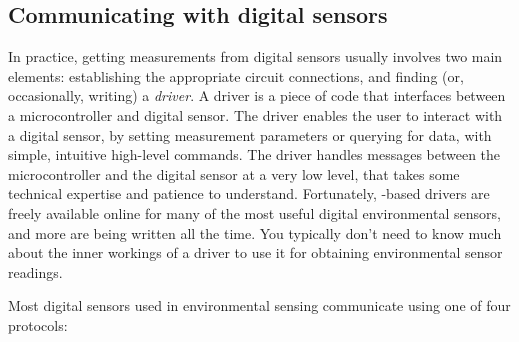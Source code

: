 \subsection{Communicating with digital sensors}
In practice, getting measurements from digital sensors usually involves two main elements: establishing the appropriate circuit connections, and finding (or, occasionally, writing) a \emph{driver}.
A driver is a piece of code that interfaces between a microcontroller and digital sensor.
The driver enables the user to interact with a digital sensor, \eg by setting measurement parameters or querying for data, with simple, intuitive high-level \Micropython commands.
The driver handles messages between the microcontroller and the digital sensor at a very low level, that takes some technical expertise and patience to understand.
Fortunately, \Micropython-based drivers are freely available online for many of the most useful digital environmental sensors, and more are being written all the time.
You typically don't need to know much about the inner workings of a driver to use it for obtaining environmental sensor readings.

Most digital sensors used in environmental sensing communicate using one of four protocols:

